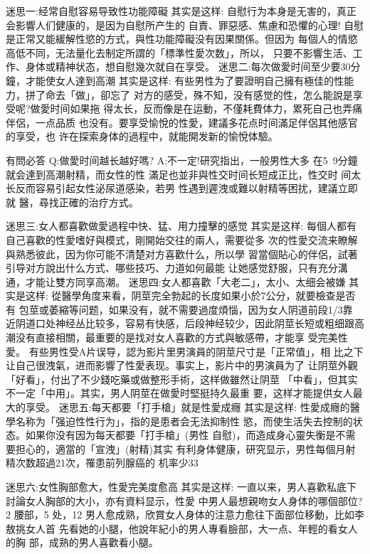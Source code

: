 \documentclass[12pt,UTF8]{ctexbook}
\begin{document}
迷思一:经常自慰容易导致性功能障礙
其实是这样:
自慰行为本身是无害的，真正会影響人们健康的，是因为自慰所产生的
自責、罪惡感、焦慮和恐懼的心理!
自慰是正常又能緩解性慾的方式，與性功能障礙没有因果關係。但因为
每個人的情慾高低不同，无法量化去制定所謂的「標準性愛次数」，所以，
只要不影響生活、工作、身体或精神状态，想自慰幾次就自在享受。
迷思二:每次做愛时间至少要30分鐘，才能使女人達到高潮
其实是这样:
有些男性为了要證明自己擁有極佳的性能力，拼了命去「做」，卻忘了
对方的感受，殊不知，没有感觉的性，怎么能說是享受呢?做愛时间如果拖
得太长，反而像是在运動，不僅耗費体力，累死自己也弄痛伴侶，一点品质
也没有。要享受愉悅的性愛，建議多花点时间滿足伴侶其他感官的享受，也
许在探索身体的過程中，就能開发新的愉悅体驗。

有問必答
Q:做愛时间越长越好嗎?
A:不一定!研究指出，一般男性大多
在5~9分鐘就会達到高潮射精，而女性的性
滿足也並非與性交时间长短成正比，性交时
间太长反而容易引起女性泌尿道感染，若男
性遇到遲洩或難以射精等困扰，建議立即就
醫，尋找正確的治疗方式。

迷思三:女人都喜歡做愛過程中快、猛、用力撞擊的感觉
其实是这样:
每個人都有自己喜歡的性愛嗜好與模式，剛開始交往的兩人，需要從多
次的性愛交流来瞭解與熟悉彼此，因为你可能不清楚对方喜歡什么，所以學
習當個貼心的伴侶，試著引导对方說出什么方式、哪些技巧、力道如何最能
让她感觉舒服，只有充分溝通，才能让雙方同享高潮。
迷思四:女人都喜歡「大老二」，太小、太细会被嫌
其实是这样:
從醫學角度来看，阴莖完全勃起的长度如果小於7公分，就要檢查是否有
包莖或萎縮等问题，如果没有，就不需要過度煩惱，因为女人阴道前段1/3靠
近阴道口处神经丛比较多，容易有快感，后段神经较少，因此阴莖长短或粗细跟高潮没有直接相關，最重要的是找对女人喜歡的方式與敏感帶，才能享
受完美性愛。
有些男性受A片误导，認为影片里男演員的阴莖尺寸是「正常值」，相
比之下让自己很洩氣，进而影響了性愛表现。事实上，影片中的男演員为了
让阴莖外觀「好看」，付出了不少錢吃藥或做整形手術，这样做雖然让阴莖
「中看」，但其实不一定「中用」。其实，男人阴莖在做愛时堅挺持久最重
要，这样才能提供女人最大的享受。
迷思五:每天都要「打手槍」就是性愛成癮
其实是这样:
性愛成癮的醫學名称为「强迫性性行为」，指的是患者会无法抑制性
慾，而使生活失去控制的状态。如果你没有因为每天都要「打手槍」(男性
自慰)，而造成身心靈失衡是不需要担心的，適當的「宣洩」(射精)其实
有利身体健康，研究显示，男性每個月射精次数超過21次，罹患前列腺癌的
机率少33%

迷思六:女性胸部愈大，性愛完美度愈高
其实是这样:
一直以来，男人喜歡私底下討論女人胸部的大小，亦有資料显示，性愛
中男人最想親吻女人身体的哪個部位?2%
腰部，5%
处，12%
男人愈成熟，欣賞女人身体的注意力愈往下面部位移動，比如李敖挑女人首
先看她的小腿，他說年紀小的男人專看臉部，大一点、年輕的看女人的胸
部，成熟的男人喜歡看小腿。
\end{document}
